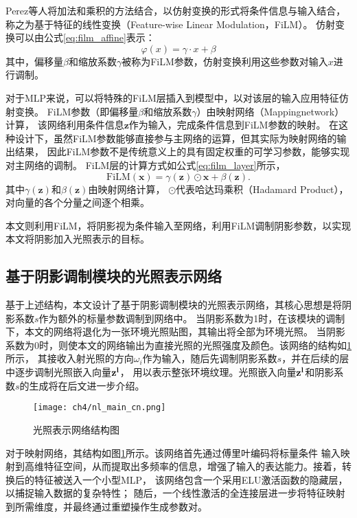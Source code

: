 Perez等人\cite{Perez_2018}将加法和乘积的方法结合，以仿射变换的形式将条件信息与输入结合，
称之为基于特征的线性变换（Feature-wise Linear Modulation，FiLM）。
仿射变换可以由公式\eqref{eq:film_affine}表示：
\begin{equation}
\label{eq:film_affine}
\varphi(x)=\gamma\cdot x+\beta
\end{equation}
其中，偏移量$\beta$和缩放系数$\gamma$被称为FiLM参数，仿射变换利用这些参数对输入$x$进行调制。

对于MLP来说，可以将特殊的FiLM层插入到模型中，以对该层的输入应用特征仿射变换。
FiLM参数（即偏移量$\beta$和缩放系数$\gamma$）由映射网络（Mappingnetwork）计算，
该网络利用条件信息$\mathbf{z}$作为输入，完成条件信息到FiLM参数的映射。
在这种设计下，虽然FiLM参数能够直接参与主网络的运算，但其实际为映射网络的输出结果，
因此FiLM参数不是传统意义上的具有固定权重的可学习参数，能够实现对主网络的调制。
FiLM层的计算方式如公式\eqref{eq:film_layer}所示，
\begin{equation}
\label{eq:film_layer}
\mathrm{FiLM}(\mathbf{x})=\gamma(\mathbf{z})\odot \mathbf{x}+\beta(\mathbf{z}).
\end{equation}
其中$\gamma(\mathbf{z})$和$\beta(\mathbf{z})$由映射网络计算，
$\odot$代表哈达玛乘积（Hadamard Product），对向量的各个分量之间逐个相乘。

本文则利用FiLM，将阴影视为条件输入至网络，利用FiLM调制阴影参数，以实现本文将阴影加入光照表示的目标。

\subsection{基于阴影调制模块的光照表示网络}

基于上述结构，本文设计了基于阴影调制模块的光照表示网络，其核心思想是将阴影系数$s$作为额外的标量参数调制到网络中。
当阴影系数为1时，在该模块的调制下，本文的网络将退化为一张环境光照贴图，其输出将全部为环境光照。
当阴影系数为0时，则使本文的网络输出为直接光照的光照强度及颜色。该网络的结构如\ref{fig:nl_main_cn}所示，
其接收入射光照的方向$\omega_i$作为输入，随后先调制阴影系数$s$，并在后续的层中逐步调制光照嵌入向量$\bf{z}^l$，
用以表示整张环境纹理。光照嵌入向量$\bf{z}^l$和阴影系数$s$的生成将在后文进一步介绍。

\begin{figure}[htb]
  \centering
  \texttt{[image: ch4/nl\_main\_cn.png]}
  \caption{光照表示网络结构图}
  \label{fig:nl_main_cn}
\end{figure}

对于映射网络，其结构如图\ref{fig:nl_main_cn}所示。该网络首先通过傅里叶编码将标量条件
输入映射到高维特征空间，从而提取出多频率的信息，增强了输入的表达能力。接着，转换后的特征被送入一个小型MLP，
该网络包含一个采用ELU激活函数的隐藏层，以捕捉输入数据的复杂特性；
随后，一个线性激活的全连接层进一步将特征映射到所需维度，并最终通过重塑操作生成参数对。

